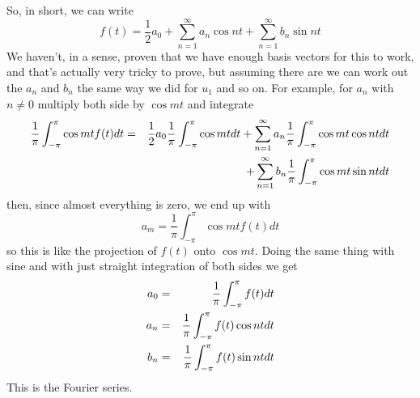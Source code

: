 \documentclass[12pt]{article}
\begin{document}
So, in short, we can write
\begin{equation}
f(t)=\frac{1}{2}a_0+\sum_{n=1}^\infty{a_n\cos{n t}}+\sum_{n=1}^\infty{b_n\sin{n t}}
\end{equation}
We haven't, in a sense, proven that we have enough basis vectors for
this to work, and that's actually very tricky to prove, but assuming
there are we can work out the $a_n$ and $b_n$ the same way we did for
$u_1$ and so on. For example, for $a_n$ with $n\not=0$ multiply both
side by $\cos{mt}$ and integrate
\begin{eqnarray}
\frac{1}{\pi}\int_{-\pi}^\pi \cos{mt}f(t)dt&=&\frac{1}{2}a_0\frac{1}{\pi}\int_{-\pi}^\pi\cos{mt}dt +\sum_{n=1}^\infty{a_n\frac{1}{\pi}\int_{-\pi}^\pi \cos{mt}\cos{n t}dt}\cr
&&+\sum_{n=1}^\infty{b_n\frac{1}{\pi}\int_{-\pi}^\pi \cos{mt}\sin{n t}dt}
\end{eqnarray}
then, since almost everything is zero, we end up with
\begin{equation}
a_m=\frac{1}{\pi}\int_{-\pi}^\pi \cos{mt}f(t)dt
\end{equation}
so this is like the projection of $f(t)$ onto $\cos{mt}$. Doing the
same thing with sine and with just straight integration of both sides
we get
\begin{eqnarray}
a_0&=&\frac{1}{\pi}\int_{-\pi}^{\pi}f(t)dt\cr
a_n&=&\frac{1}{\pi}\int_{-\pi}^{\pi}f(t)\cos{n t}dt\cr
b_n&=&\frac{1}{\pi}\int_{-\pi}^{\pi}f(t)\sin{n t}dt
\end{eqnarray} 
This is the Fourier series.
\end{document}

